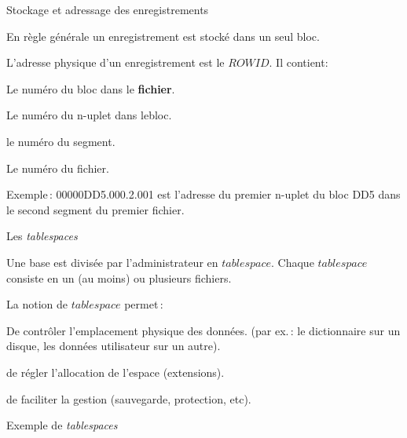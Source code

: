 \begin{frame}{Stockage et adressage des enregistrements}

En règle générale un 
enregistrement est stocké dans un seul bloc.
\vfill


L'adresse physique d'un enregistrement est le $ROWID$. Il contient:
\vfill

\begin{redbullet}
   \item Le numéro du bloc dans le {\bf fichier}.
   \item Le numéro du n-uplet dans lebloc.
   \item le numéro du segment.
   \item Le numéro du fichier.
\end{redbullet}
Exemple\,: 00000DD5.000.2.001 est l'adresse du premier n-uplet
du bloc DD5 dans le second segment du premier fichier.

\end{frame}


\begin{frame}{Les {\it tablespaces}}

Une base est divisée par l'administrateur
   en $tablespace$. Chaque $tablespace$ consiste en un (au moins)
        ou plusieurs fichiers.

\vfill

La notion de $tablespace$ permet\,:

\vfill

\begin{redbullet}
  \item De contr\^oler l'emplacement physique des données.
        (par ex.\,: le dictionnaire sur un disque,
        les données utilisateur sur un autre).

  \item de régler l'allocation de l'espace (extensions).

  \item de faciliter la gestion (sauvegarde, protection, etc).
\end{redbullet}

\end{frame}

\begin{frame}{Exemple de  {\it tablespaces}}


\end{frame}

